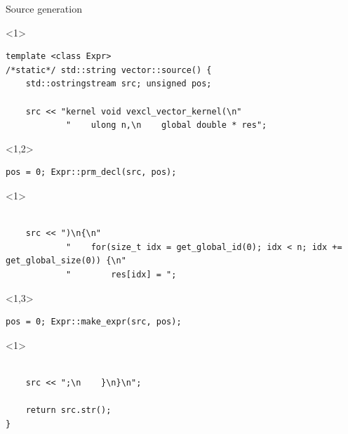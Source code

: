 \documentclass[@BEAMER_OPTIONS@]{beamer}
\begin{document}
\begin{frame}[fragile]{Source generation}
    \begin{exampleblock}{}
        \begin{uncoverenv}<1>
            \begin{lstlisting}
template <class Expr>
/*static*/ std::string vector::source() {
    std::ostringstream src; unsigned pos;

    src << "kernel void vexcl_vector_kernel(\n"
            "    ulong n,\n    global double * res";

            \end{lstlisting}
        \end{uncoverenv}
        \begin{uncoverenv}<1,2>
            \begin{lstlisting}[firstnumber=last]
    pos = 0; Expr::prm_decl(src, pos);
            \end{lstlisting}
        \end{uncoverenv}
        \begin{uncoverenv}<1>
            \begin{lstlisting}[firstnumber=last]

    src << ")\n{\n"
            "    for(size_t idx = get_global_id(0); idx < n; idx += get_global_size(0)) {\n"
            "        res[idx] = ";

            \end{lstlisting}
        \end{uncoverenv}
        \begin{uncoverenv}<1,3>
            \begin{lstlisting}[firstnumber=last]
    pos = 0; Expr::make_expr(src, pos);
            \end{lstlisting}
        \end{uncoverenv}
        \begin{uncoverenv}<1>
            \begin{lstlisting}[firstnumber=last]

    src << ";\n    }\n}\n";

    return src.str();
}
            \end{lstlisting}
        \end{uncoverenv}
    \end{exampleblock}
\end{frame}
\end{document}
